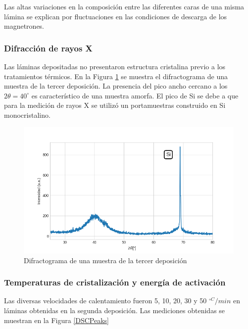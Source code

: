 \documentclass[12pt]{article}
\theoremstyle{definition}
\theoremstyle{remark}
\begin{document}
{Las altas variaciones en la composición entre las diferentes caras de una misma lámina se explican por fluctuaciones en las condiciones de descarga de los magnetrones. 

\subsubsection{Difracción de rayos X}
Las láminas depositadas no presentaron estructura cristalina previo a los tratamientos térmicos. En la Figura \ref{amorfo} se muestra el difractograma de una muestra de la tercer deposición. La presencia del pico ancho cercano a los $2\theta=40^\circ$  es característico de una muestra amorfa. El pico de Si se debe a que para la medición de rayos X se utilizó un portamuestras construido en Si monocristalino.

\begin{figure}[H]
 	\centering
	\includegraphics[scale=0.6]{img/RX_amorfo.png}
 	\caption{Difractograma de una muestra de la tercer deposición}
	\label{amorfo}
\end{figure}


\subsubsection{Temperaturas de cristalización y energía de activación}

Las diversas velocidades de calentamiento fueron 5, 10, 20, 30 y 50 $^{\circ C }/min$ en láminas obtenidas en la segunda deposición. Las mediciones obtenidas se muestran en la Figura \ref{DSCPeaks}

}
\end{document}
